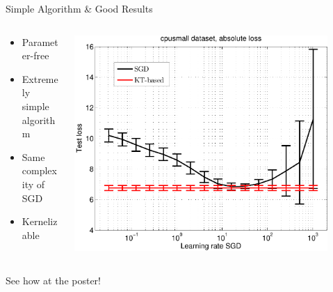 \documentclass{beamer}
\begin{document}
\begin{frame}{Simple Algorithm \& Good Results}

\begin{columns}[c]
  \begin{column}{5cm}
   \small
   \begin{itemize}
    \item Parameter-free
    \item Extremely simple algorithm
    \item Same complexity of SGD
    \item Kernelizable
    \end{itemize}
  \end{column}
  \begin{column}{6cm}
    \includegraphics[width=0.9\textwidth]{../figs/cpusmall_kt_train_test-crop}
  \end{column}
\end{columns}

\vspace{.25cm}


\begin{center}
\huge
See how at the poster!
\end{center}

\end{frame}
\end{document}
